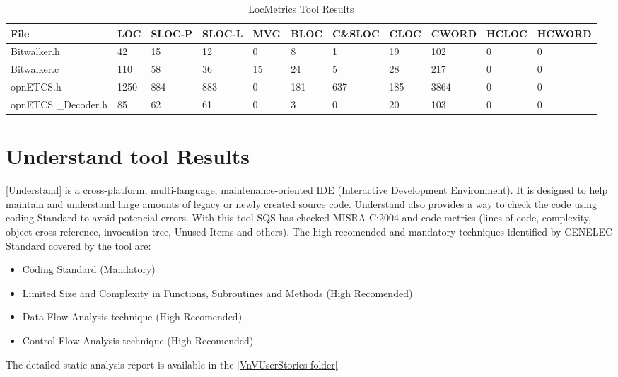 \begin{longtable}{||p{}|p{}|p{}|p{}|p{}|p{}|p{}|p{}|p{}|p{}|p{}||}
  \caption{LocMetrics Tool Results}\\
    \hline\hline
    \textbf{File} & LOC &  SLOC-P & SLOC-L & MVG & BLOC & C\&SLOC & CLOC & CWORD & HCLOC & HCWORD \\
    \hline\hline
    \endhead
    \hline\hline
    \endfoot
    Bitwalker.h &
    42 & 15 & 12 & 0 & 8 & 1 & 19 & 102 & 0 & 0
    \\
    \hline
    Bitwalker.c &
    110 & 58 & 36 & 15 & 24 & 5 & 28 & 217 & 0 & 0
    \\
    \hline
    opnETCS.h &
    1250 & 884 & 883 & 0 & 181 & 637 & 185 & 3864 & 0 & 0
    \\
    \hline
    opnETCS
    \_Decoder.h &
    85 & 62 & 61 & 0 & 3 & 0 & 20 & 103 & 0 & 0
    \\
    \hline
\end{longtable}

\section{Understand tool Results}
\href{http://www.scitools.com/}{[Understand]} is a cross-platform, multi-language, maintenance-oriented IDE (Interactive Development Environment). It is designed to help maintain and understand large amounts of legacy or newly created source code. 
Understand also provides a way to check the code using coding Standard to avoid potencial errors. With this tool SQS has checked MISRA-C:2004 and code metrics (lines of code, complexity, object cross reference, invocation tree, Unused Items and others). The high recomended and mandatory techniques identified by CENELEC Standard covered by the tool are:
\begin{itemize}
\item Coding Standard (Mandatory)
\item Limited Size and Complexity in Functions, Subroutines and Methods (High Recomended)
\item Data Flow Analysis technique (High Recomended)
\item Control Flow Analysis technique (High Recomended)
\end{itemize}

The detailed static analysis report is available in the \href{https://github.com/openETCS/validation/tree/master/VnVUserStories/VnVUserStorySQS/04-Results}{[VnVUserStories folder]}

